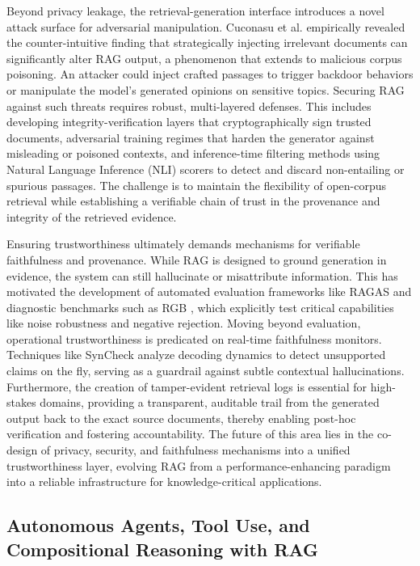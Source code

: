 \documentclass[11pt,a4paper]{article}
\begin{document}
Beyond privacy leakage, the retrieval-generation interface introduces a novel attack surface for adversarial manipulation. Cuconasu et al. \cite{arxiv:2401.14887v3} empirically revealed the counter-intuitive finding that strategically injecting irrelevant documents can significantly alter RAG output, a phenomenon that extends to malicious corpus poisoning. An attacker could inject crafted passages to trigger backdoor behaviors or manipulate the model's generated opinions on sensitive topics. Securing RAG against such threats requires robust, multi-layered defenses. This includes developing integrity-verification layers that cryptographically sign trusted documents, adversarial training regimes that harden the generator against misleading or poisoned contexts, and inference-time filtering methods using Natural Language Inference (NLI) scorers to detect and discard non-entailing or spurious passages. The challenge is to maintain the flexibility of open-corpus retrieval while establishing a verifiable chain of trust in the provenance and integrity of the retrieved evidence.

Ensuring trustworthiness ultimately demands mechanisms for verifiable faithfulness and provenance. While RAG is designed to ground generation in evidence, the system can still hallucinate or misattribute information. This has motivated the development of automated evaluation frameworks like RAGAS \cite{arxiv:2309.15217v1} and diagnostic benchmarks such as RGB \cite{arxiv:2309.01431v2}, which explicitly test critical capabilities like noise robustness and negative rejection. Moving beyond evaluation, operational trustworthiness is predicated on real-time faithfulness monitors. Techniques like SynCheck analyze decoding dynamics to detect unsupported claims on the fly, serving as a guardrail against subtle contextual hallucinations. Furthermore, the creation of tamper-evident retrieval logs is essential for high-stakes domains, providing a transparent, auditable trail from the generated output back to the exact source documents, thereby enabling post-hoc verification and fostering accountability. The future of this area lies in the co-design of privacy, security, and faithfulness mechanisms into a unified trustworthiness layer, evolving RAG from a performance-enhancing paradigm into a reliable infrastructure for knowledge-critical applications.


\subsection{Autonomous Agents, Tool Use, and Compositional Reasoning with RAG}
\end{document}
